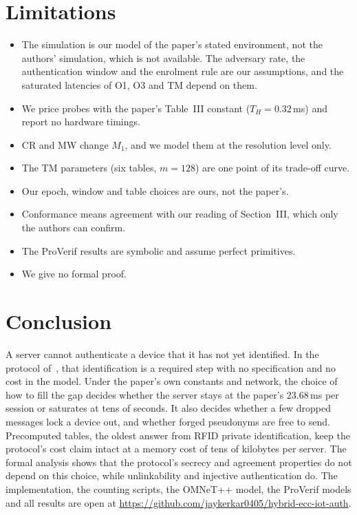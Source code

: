 \section{Limitations}
\begin{itemize}
\item The simulation is our model of the paper's stated environment, not the authors' simulation, which is not
available. The adversary rate, the authentication window and the enrolment rule are our assumptions, and the saturated
latencies of O1, O3 and TM depend on them.
\item We price probes with the paper's Table~III constant ($T_H=0.32$\,ms) and report no hardware timings.
\item CR and MW change $M_1$, and we model them at the resolution level only.
\item The TM parameters (six tables, $m=128$) are one point of its trade-off curve.
\item Our epoch, window and table choices are ours, not the paper's.
\item Conformance means agreement with our reading of Section~III, which only the authors can confirm.
\iffv
\item The ProVerif results are symbolic and assume perfect primitives.
\else
\item We give no formal proof.
\fi
\end{itemize}

\section{Conclusion}
A server cannot authenticate a device that it has not yet identified. In the protocol of~\cite{base}, that
identification is a required step with no specification and no cost in the model. Under the paper's own constants and
network, the choice of how to fill the gap decides whether the server stays at the paper's 23.68\,ms per session or
saturates at tens of seconds. It also decides whether a few dropped messages lock a device out, and whether forged
pseudonyms are free to send. Precomputed tables, the oldest answer from RFID private identification, keep the protocol's
cost claim intact at a memory cost of tens of kilobytes per server.
\iffv
The formal analysis shows that the protocol's secrecy and agreement properties do not depend on this choice, while
unlinkability and injective authentication do.
\fi
The implementation, the counting scripts, the OMNeT++ model\iffv, the ProVerif models\fi{} and all results are open at
\url{https://github.com/jaykerkar0405/hybrid-ecc-iot-auth}.

